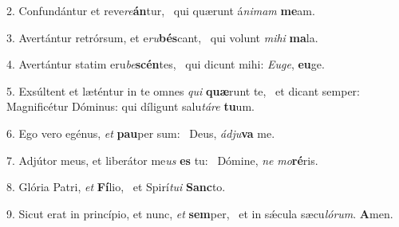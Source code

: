 2. Confundántur et reve\textit{re}\textbf{án}tur, \ast\  qui quærunt á\textit{ni}\textit{mam} \textbf{me}am.\

3. Avertántur retrórsum, et e\textit{ru}\textbf{bés}cant, \ast\  qui volunt \textit{mi}\textit{hi} \textbf{ma}la.\

4. Avertántur statim eru\textit{be}\textbf{scén}tes, \ast\  qui dicunt mihi: \textit{Eu}\textit{ge}, \textbf{eu}ge.\

5. Exsúltent et læténtur in te omnes \textit{qui} \textbf{quæ}runt te, \ast\  et dicant semper: Magnificétur Dóminus: qui díligunt salu\textit{tá}\textit{re} \textbf{tu}um.\

6. Ego vero egénus, \textit{et} \textbf{pau}per sum: \ast\  Deus, \textit{ád}\textit{ju}\textbf{va} me.\

7. Adjútor meus, et liberátor me\textit{us} \textbf{es} tu: \ast\  Dómine, \textit{ne} \textit{mo}\textbf{ré}ris.\

8. Glória Patri, \textit{et} \textbf{Fí}lio, \ast\  et Spirí\textit{tu}\textit{i} \textbf{Sanc}to.\

9. Sicut erat in princípio, et nunc, \textit{et} \textbf{sem}per, \ast\  et in sǽcula sæcu\textit{ló}\textit{rum}. \textbf{A}men.\

